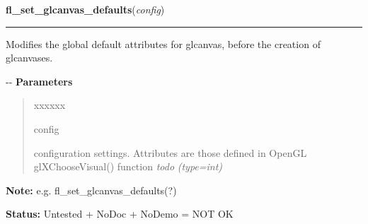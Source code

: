     \label{xformslib:flglcanvas:fl_set_glcanvas_defaults}

    \vspace{0.5ex}

\hspace{.8\funcindent}\begin{boxedminipage}{\funcwidth}

    \raggedright \textbf{fl\_set\_glcanvas\_defaults}(\textit{config})

    \vspace{-1.5ex}

    \rule{\textwidth}{0.5\fboxrule}
\setlength{\parskip}{2ex}

Modifies the global default attributes for glcanvas, before the
creation of glcanvases.

-{}-
\setlength{\parskip}{1ex}
      \textbf{Parameters}
      \vspace{-1ex}

      \begin{quote}
        \begin{Ventry}{xxxxxx}

          \item[config]


configuration settings. Attributes are those defined in OpenGL
glXChooseVisual() function \emph{todo}
            {\it (type=int)}

        \end{Ventry}

      \end{quote}

\textbf{Note:} 
e.g. fl\_set\_glcanvas\_defaults(?)


\textbf{Status:} 
Untested + NoDoc + NoDemo = NOT OK


    \end{boxedminipage}

    \label{xformslib:flglcanvas:fl_get_glcanvas_defaults}

    \vspace{0.5ex}

